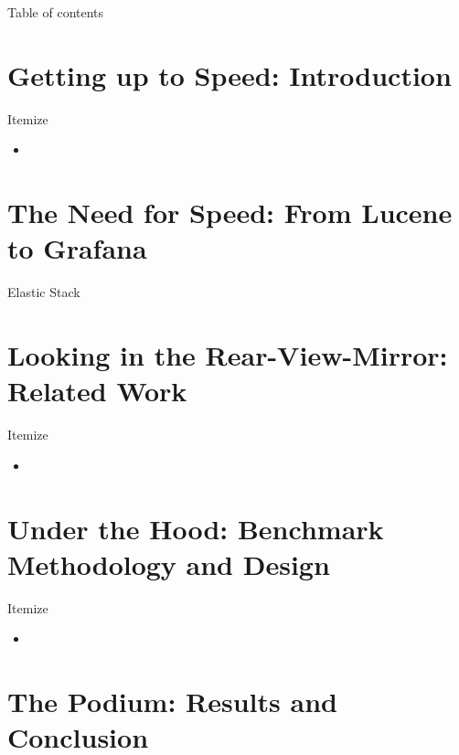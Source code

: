 \documentclass[compress,aspectratio=169]{beamer}
\begin{document}
\begin{frame}[plain]
	\titlepage
\end{frame}

\begin{frame}[t]{Table of contents}
  \tableofcontents[subsectionstyle=hide/hide]
\end{frame}


\section[Introduction]{Getting up to Speed: Introduction}
\begin{frame}{Itemize}
  \begin{itemize}
    \item
  \end{itemize}
\end{frame}
\section[Overview]{The Need for Speed: From Lucene to Grafana}
\begin{frame}{Elastic Stack}
\end{frame}
\section[Related Work]{Looking in the Rear-View-Mirror: Related Work}
\begin{frame}{Itemize}
  \begin{itemize}
    \item
  \end{itemize}
\end{frame}
\section[Methodology]{Under the Hood: Benchmark Methodology and Design}
\begin{frame}{Itemize}
  \begin{itemize}
    \item
  \end{itemize}
\end{frame}
\section[Results]{The Podium: Results and Conclusion}
\end{document}
